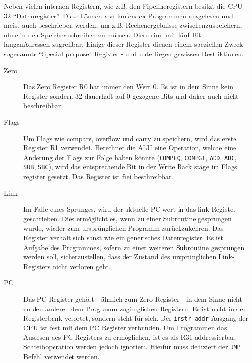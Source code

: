 \documentclass[paper=a4,fontsize=11pt,twocolumn]{scrreprt}
\begin{document}
Neben vielen internen Registern, wie z.B. den Pipelineregistern besitzt die CPU 32 \enquote{Datenregister}.
Diese können von laufenden Programmen ausgelesen und meist auch beschrieben werden, um z.B. Rechenergebnisse zwischenzuspeichern, ohne in den Speicher schreiben zu müssen. 
Diese sind mit fünf Bit langen\footnotemark Adressen zugreifbar.
Einige dieser Register dienen einem speziellen Zweck - sogenannte \enquote{Special purpose} Register - und unterliegen gewissen Restriktionen.
\begin{description}
    \item[Zero]
        Das Zero Register R0 hat immer den Wert $0$.
        Es ist in dem Sinne kein Register sondern 32 dauerhaft auf 0 gezogene Bits und daher auch nicht beschreibbar.
    \item[Flags]
        Um Flags wie compare, overflow und carry zu speichern, wird das erste Register R1 verwendet.
        Berechnet die ALU eine Operation, welche eine Änderung der Flags zur Folge haben könnte (\texttt{COMPEQ}, \texttt{COMPGT}, \texttt{ADD}, \texttt{ADC}, \texttt{SUB}, \texttt{SBC}), wird das entsprechende Bit in der Write Back stage im Flags register gesetzt.
        Das Register ist frei beschreibbar.
    \item[Link]
        Im Falle eines Sprunges, wird der aktuelle PC wert in das link Register geschrieben.
        Dies ermöglicht es, wenn zu einer Subroutine gesprungen wurde, wieder zum ursprünglichen Programm zurückzukehren.
        Das Register verhält sich sonst wie ein generisches Datenregister.
        Es ist Aufgabe des Programmes, sofern zu einer weiteren Subroutine gesprungen werden soll, sicherzustellen, dass der Zustand des ursprünglichen Link-Registers nicht verloren geht.
    \item[PC]
        Das PC Register gehört - ähnlich zum Zero-Register - in dem Sinne nicht zu den anderen dem Programm zugänglichen Registern.
        Es ist nicht in der Registerbank verortet, sondern steht für sich.
        Der \texttt{instr\_addr} Ausgang der CPU ist fest mit dem PC Register verbunden.
        Um Programmen das Auslesen des PC Registers zu ermöglichen, ist es als R31 addressierbar. Schreiboperation werden jedoch ignoriert.
        Hierfür muss dediziert der \texttt{JMP} Befehl verwendet werden.
\end{description}
\end{document}
